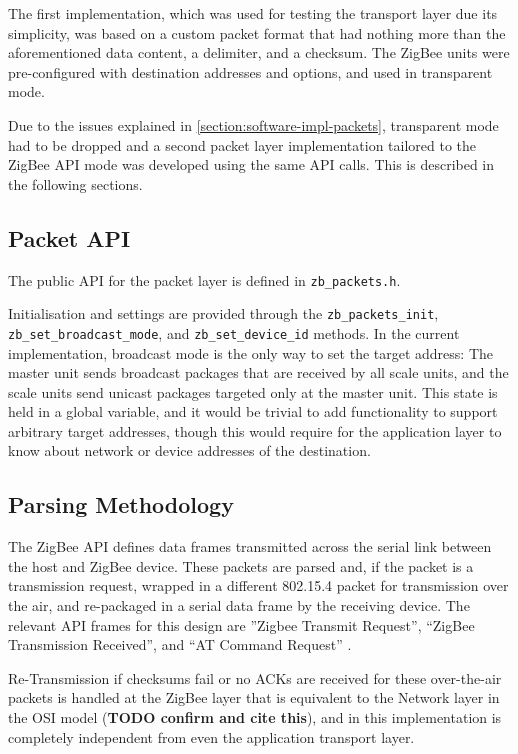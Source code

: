 The first implementation, which was used for testing the transport layer due its simplicity, was based on a custom packet format that had nothing more than the aforementioned data content, a delimiter, and a checksum. The ZigBee units were pre-configured with destination addresses and options, and used in transparent mode.

Due to the issues explained in \ref{section:software-impl-packets}, transparent mode had to be dropped and a second packet layer implementation tailored to the ZigBee API mode was developed using the same API calls. This is described in the following sections. 

\subsection{Packet API}
The public API for the packet layer is defined in \texttt{zb\_packets.h}. 

Initialisation and settings are provided through the \texttt{zb\_packets\_init}, \texttt{zb\_set\_broadcast\_mode}, and \texttt{zb\_set\_device\_id} methods. In the current implementation, broadcast mode is the only way to set the target address: The master unit sends broadcast packages that are received by all scale units, and the scale units send unicast packages targeted only at the master unit. This state is held in a global variable, and it would be trivial to add functionality to support arbitrary target addresses, though this would require for the application layer to know about network or device addresses of the destination.


\subsection{Parsing Methodology}
The ZigBee API defines data frames transmitted across the serial link between the host and ZigBee device. These packets are parsed and, if the packet is a transmission request, wrapped in a different 802.15.4 packet for transmission over the air, and re-packaged in a serial data frame by the receiving device. The relevant API frames for this design are ''Zigbee Transmit Request'', ``ZigBee Transmission Received'', and ``AT Command Request'' \cite[cf. section 6, API Operation]{xbee-datasheet}.

Re-Transmission if checksums fail or no ACKs are received for these over-the-air packets is handled at the ZigBee layer that is equivalent to the Network layer in the OSI model (\textbf{TODO confirm and cite this}), and in this implementation is completely independent from even the application transport layer.

